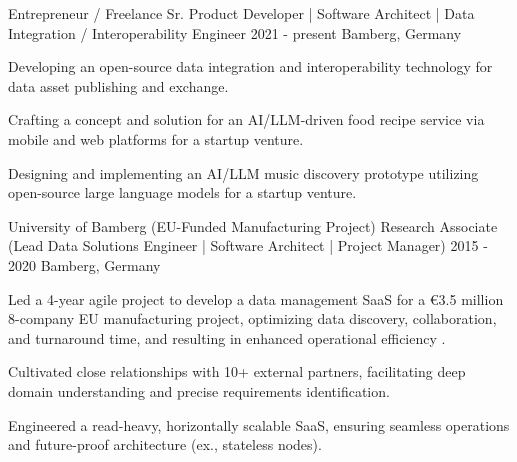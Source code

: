 {}


\begin{cventries}




    
        
  \cventry
    {Entrepreneur / Freelance} %
    {Sr. Product Developer | Software Architect | Data Integration / Interoperability Engineer}
    {2021 - present} %
    {Bamberg, Germany} %
    {
      \begin{cvitems} %
		\item {Developing an open-source data integration and interoperability technology for data asset publishing and exchange.}  
		\item {Crafting a concept and solution for an AI/LLM-driven food recipe service via mobile and web platforms for a startup venture.}
		\item {Designing and implementing an AI/LLM music discovery prototype utilizing open-source large language models for a startup venture.}
    \end{cvitems}
    }
    



    
        
  \cventry
    {University of Bamberg (EU-Funded Manufacturing Project)} %
    {Research Associate (Lead Data Solutions Engineer | Software Architect | Project Manager)}
    {2015 - 2020} %
    {Bamberg, Germany} %
    {
      \begin{cvitems} %
		\item {Led a 4-year agile project to develop a data management SaaS for a €3.5 million 8-company EU manufacturing project, optimizing data discovery, collaboration, and turnaround time, and resulting in enhanced operational efficiency .}
		\item {Cultivated close relationships with 10+ external partners, facilitating deep domain understanding and precise requirements identification.}
		\item {Engineered a read-heavy, horizontally scalable SaaS, ensuring seamless operations and future-proof architecture (ex., stateless nodes).}
      \end{cvitems}
    }


\end{cventries}
